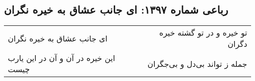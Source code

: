 \begin{center}
\section*{رباعی شماره ۱۳۹۷: ای جانب عشاق به خیره نگران}
\label{sec:1397}
\begin{longtable}{l p{0.5cm} r}
ای جانب عشاق به خیره نگران
&&
تو خیره و در تو گشته خیره دگران
\\
این خیره در آن و آن در این یارب چیست
&&
جمله ز تواند بی‌دل و بی‌جگران
\\
\end{longtable}
\end{center}
